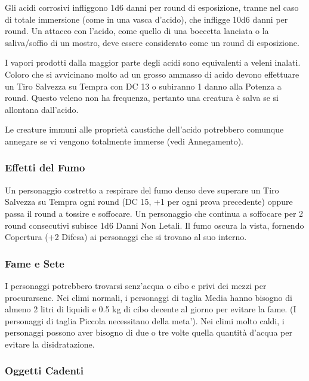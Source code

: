 \documentclass[a4paper,11pt,twoside,openany]{book}
\begin{document}
{\label{effetti-dellacido}

Gli acidi corrosivi infliggono 1d6 danni per round di esposizione, tranne nel caso di totale immersione (come in una vasca d'acido), che infligge 10d6 danni per round. Un attacco con l'acido, come quello di una boccetta lanciata o la saliva/soffio di un mostro, deve essere considerato come un round di esposizione.

I vapori prodotti dalla maggior parte degli acidi sono equivalenti a veleni inalati. Coloro che si avvicinano molto ad un grosso ammasso di acido devono effettuare un Tiro Salvezza su Tempra con DC 13 o subiranno 1 danno alla Potenza a round. Questo veleno non ha frequenza, pertanto una creatura è salva se si allontana dall'acido.

Le creature immuni alle proprietà caustiche dell'acido potrebbero comunque annegare se vi vengono totalmente immerse (vedi Annegamento).

\subsubsection{Effetti del Fumo}

\label{effetti-del-fumo}

Un personaggio costretto a respirare del fumo denso deve superare un Tiro Salvezza su Tempra ogni round (DC 15, +1 per ogni prova precedente) oppure passa il round a tossire e soffocare. Un personaggio che continua a soffocare per 2 round consecutivi subisce 1d6 Danni Non Letali. Il fumo oscura la vista, fornendo Copertura (+2 Difesa) ai personaggi che si trovano al suo interno.

\subsubsection{Fame e Sete}

\label{fame-e-sete}

I personaggi potrebbero trovarsi senz'acqua o cibo e privi dei mezzi per procurarsene. Nei climi normali, i personaggi di taglia Media hanno bisogno di almeno 2 litri di liquidi e 0.5 kg di cibo decente al giorno per evitare la fame. (I personaggi di taglia Piccola necessitano della meta'). Nei climi molto caldi, i personaggi possono aver bisogno di due o tre volte quella quantità d'acqua per evitare la disidratazione.

\subsubsection{Oggetti Cadenti}

}
\end{document}

